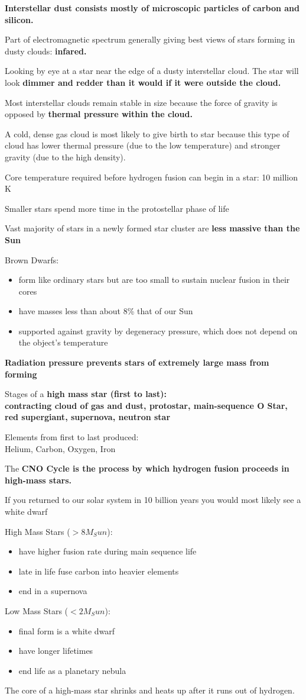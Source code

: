 \bf{Interstellar dust} consists mostly of microscopic particles of carbon and silicon.

Part of electromagnetic spectrum generally giving best views of stars forming in dusty clouds: \bf{infared}.

Looking by eye at a star near the edge of a dusty interstellar cloud. The star will look \bf{dimmer and redder} than it would if it were outside the cloud.

Most interstellar clouds remain stable in size because the force of gravity is opposed by \bf{thermal pressure} within the cloud.

A cold, dense gas cloud is most likely to give birth to star because this type of cloud has lower thermal pressure (due to the low temperature) and stronger gravity (due to the high density).

Core temperature required before hydrogen fusion can begin in a star: 10 million K

Smaller stars spend more time in the protostellar phase of life

Vast majority of stars in a newly formed star cluster are \bf{less massive than the Sun}

Brown Dwarfs:
\begin{itemize}
\item form like ordinary stars but are too small to sustain nuclear fusion in their cores
\item have masses less than about 8\% that of our Sun
\item supported against gravity by degeneracy pressure, which does not depend on the object's temperature
\end{itemize}
\bf{Radiation pressure} prevents stars of extremely large mass from forming

Stages of a \bf{high mass star} (first to last):\\
contracting cloud of gas and dust, protostar, main-sequence O Star, red supergiant, supernova, neutron star

Elements from first to last produced: \\
Helium, Carbon, Oxygen, Iron

The \bf{CNO Cycle} is the process by which hydrogen fusion proceeds in high-mass stars.

If you returned to our solar system in 10 billion years you would most likely see a white dwarf

High Mass Stars ($>8M_Sun$):
\begin{itemize}
\item have higher fusion rate during main sequence life
\item late in life fuse carbon into heavier elements
\item end in a supernova
\end{itemize}
Low Mass Stars ($<2M_Sun$):
\begin{itemize}
\item final form is a white dwarf
\item have longer lifetimes
\item end life as a planetary nebula
\end{itemize}
The core of a high-mass star shrinks and heats up after it runs out of hydrogen.
